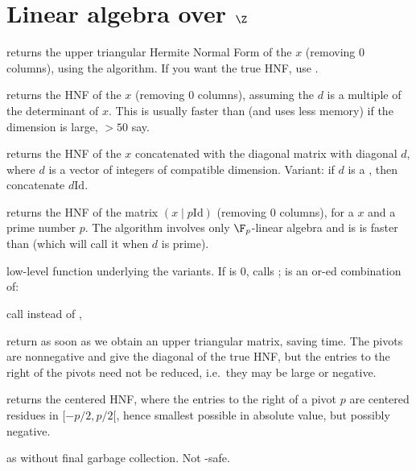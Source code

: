 \section{Linear algebra over $\Z$}

 returns the upper triangular Hermite Normal Form of the
 $x$ (removing $0$ columns), using the  algorithm. If you
want the true HNF, use .

 returns the HNF of the  $x$
(removing $0$ columns), assuming the  $d$ is a multiple of the
determinant of $x$. This is usually faster than  (and uses less
memory) if the dimension is large, $> 50$ say.

 returns the HNF of the 
$x$ concatenated with the diagonal matrix with diagonal $d$, where $d$ is a
vector of integers of compatible dimension. Variant: if $d$ is a ,
then concatenate $d \text{Id}$.

 returns the HNF of the matrix $(x \mid p
\text{Id})$ (removing $0$ columns), for a  $x$ and a prime number $p$.
The algorithm involves only $\F_p$-linear algebra and is is faster than
 (which will call it when $d$ is prime).

 low-level function
underlying the  variants. If  is $0$, calls
;  is an or-ed combination of:

\item {} call  instead of ,

\item {} return as soon as we obtain an upper triangular matrix,
saving time. The pivots are nonnegative and give the diagonal of the true HNF,
but the entries to the right of the pivots need not be reduced, i.e.~they may be
large or negative.

\item {} returns the centered HNF, where the entries to the
right of a pivot $p$ are centered residues in $[-p/2, p/2[$, hence smallest
possible in absolute value, but possibly negative.

 as 
without final garbage collection. Not -safe.

